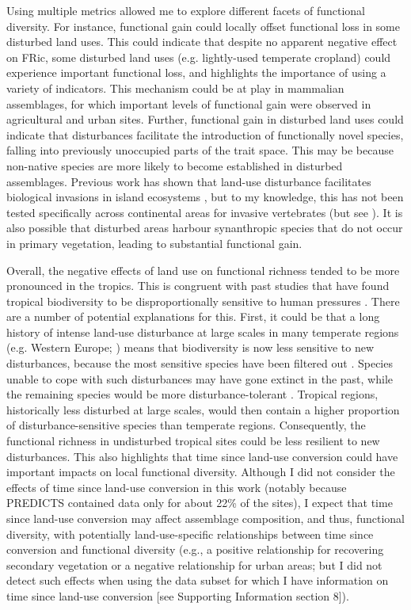 Using multiple metrics allowed me to explore different facets of functional diversity. For instance, functional gain could locally offset functional loss in some disturbed land uses. This could indicate that despite no apparent negative effect on FRic, some disturbed land uses (e.g. lightly-used temperate cropland) could experience important functional loss, and highlights the importance of using a variety of indicators. This mechanism could be at play in mammalian assemblages, for which important levels of functional gain were observed in agricultural and urban sites. Further, functional gain in disturbed land uses could indicate that disturbances facilitate the introduction of functionally novel species, falling into previously unoccupied parts of the trait space. This may be because non-native species are more likely to become established in disturbed assemblages. Previous work has shown that land-use disturbance facilitates biological invasions in island ecosystems \citep{Jesse2018,Sanchez-Ortiz2019}, but to my knowledge, this has not been tested specifically across continental areas for invasive vertebrates (but see \citet{Pysek2010}). It is also possible that disturbed areas harbour synanthropic species that do not occur in primary vegetation, leading to substantial functional gain.

Overall, the negative effects of land use on functional richness tended to be more pronounced in the tropics. This is congruent with past studies that have found tropical biodiversity to be disproportionally sensitive to human pressures \citep{Newbold2020, Martins2017}. There are a number of potential explanations for this. First, it could be that a long history of intense land-use disturbance at large scales in many temperate regions (e.g. Western Europe; \citet{Stephens2019}) means that biodiversity is now less sensitive to new disturbances, because the most sensitive species have been filtered out \citep{Balmford1996, Krauss2010, LeProvost2020, Munteanu2020}. Species unable to cope with such disturbances may have gone extinct in the past, while the remaining species would be more disturbance-tolerant \citep{Betts2019}. Tropical regions, historically less disturbed at large scales, would then contain a higher proportion of disturbance-sensitive species than temperate regions. Consequently, the functional richness in undisturbed tropical sites could be less resilient to new disturbances. This also highlights that time since land-use conversion could have important impacts on local functional diversity. Although I did not consider the effects of time since land-use conversion in this work (notably because PREDICTS contained data only for about 22\% of the sites), I expect that time since land-use conversion may affect assemblage composition, and thus, functional diversity, with potentially land-use-specific relationships between time since conversion and functional diversity (e.g., a positive relationship for recovering secondary vegetation or a negative relationship for urban areas; but I did not detect such effects when using the data subset for which I have information on time since land-use conversion [see Supporting Information section 8]).


